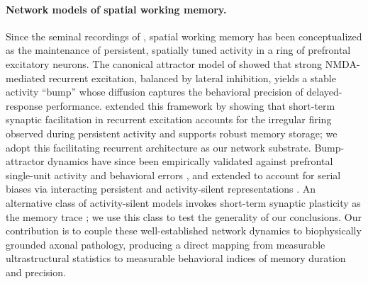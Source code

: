 \paragraph{Network models of spatial working memory.}
Since the seminal recordings of \citet{funahashi1989mnemonic}, spatial working memory has been conceptualized as the maintenance of persistent, spatially tuned activity in a ring of prefrontal excitatory neurons. The canonical attractor model of \citet{compte2000synaptic} showed that strong NMDA-mediated recurrent excitation, balanced by lateral inhibition, yields a stable activity ``bump'' whose diffusion captures the behavioral precision of delayed-response performance. \citet{hansel2013short} extended this framework by showing that short-term synaptic facilitation in recurrent excitation accounts for the irregular firing observed during persistent activity and supports robust memory storage; we adopt this facilitating recurrent architecture as our network substrate. Bump-attractor dynamics have since been empirically validated against prefrontal single-unit activity and behavioral errors \citep{wimmer2014bump,panichello2019error}, and extended to account for serial biases via interacting persistent and activity-silent representations \citep{barbosa2020interplay}. An alternative class of activity-silent models invokes short-term synaptic plasticity as the memory trace \citep{mongillo2008synaptic,wolff2015hidden}; we use this class to test the generality of our conclusions. Our contribution is to couple these well-established network dynamics to biophysically grounded axonal pathology, producing a direct mapping from measurable ultrastructural statistics to measurable behavioral indices of memory duration and precision.
